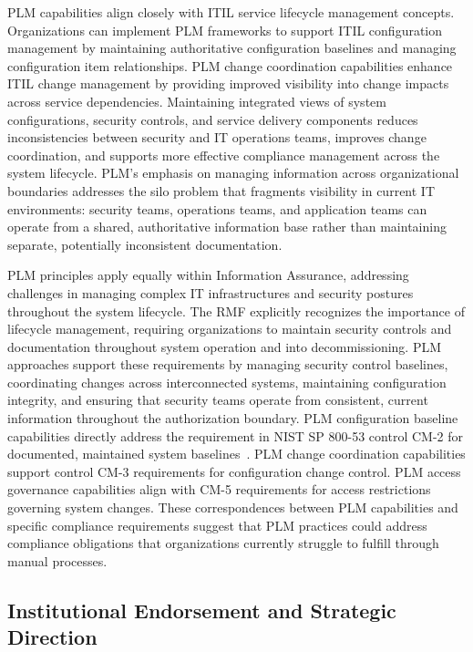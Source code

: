 PLM capabilities align closely with ITIL service lifecycle management concepts. Organizations can implement PLM frameworks to support ITIL configuration management by maintaining authoritative configuration baselines and managing configuration item relationships. PLM change coordination capabilities enhance ITIL change management by providing improved visibility into change impacts across service dependencies. Maintaining integrated views of system configurations, security controls, and service delivery components reduces inconsistencies between security and IT operations teams, improves change coordination, and supports more effective compliance management across the system lifecycle. PLM's emphasis on managing information across organizational boundaries addresses the silo problem that fragments visibility in current IT environments: security teams, operations teams, and application teams can operate from a shared, authoritative information base rather than maintaining separate, potentially inconsistent documentation.

PLM principles apply equally within Information Assurance, addressing challenges in managing complex IT infrastructures and security postures throughout the system lifecycle. The RMF explicitly recognizes the importance of lifecycle management, requiring organizations to maintain security controls and documentation throughout system operation and into decommissioning. PLM approaches support these requirements by managing security control baselines, coordinating changes across interconnected systems, maintaining configuration integrity, and ensuring that security teams operate from consistent, current information throughout the authorization boundary. PLM configuration baseline capabilities directly address the requirement in NIST SP 800-53 control CM-2 for documented, maintained system baselines~\parencite{Force_2020}. PLM change coordination capabilities support control CM-3 requirements for configuration change control. PLM access governance capabilities align with CM-5 requirements for access restrictions governing system changes. These correspondences between PLM capabilities and specific compliance requirements suggest that PLM practices could address compliance obligations that organizations currently struggle to fulfill through manual processes.

\subsection{Institutional Endorsement and Strategic Direction}


